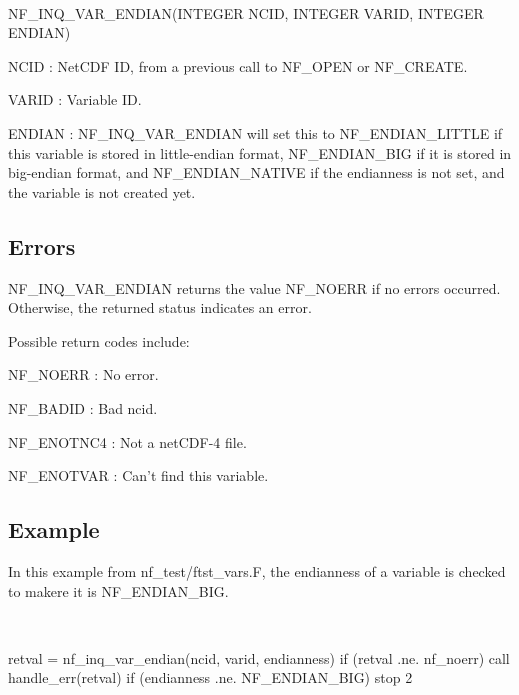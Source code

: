  

N\+F\+\_\+\+I\+N\+Q\+\_\+\+V\+A\+R\+\_\+\+E\+N\+D\+I\+A\+N(\+I\+N\+T\+E\+G\+E\+R N\+C\+I\+D, I\+N\+T\+E\+G\+E\+R V\+A\+R\+I\+D, I\+N\+T\+E\+G\+E\+R E\+N\+D\+I\+A\+N)

{\ttfamily N\+C\+ID} \+: Net\+C\+DF ID, from a previous call to N\+F\+\_\+\+O\+P\+EN or N\+F\+\_\+\+C\+R\+E\+A\+TE.

{\ttfamily V\+A\+R\+ID} \+: Variable ID.

{\ttfamily E\+N\+D\+I\+AN} \+: N\+F\+\_\+\+I\+N\+Q\+\_\+\+V\+A\+R\+\_\+\+E\+N\+D\+I\+AN will set this to N\+F\+\_\+\+E\+N\+D\+I\+A\+N\+\_\+\+L\+I\+T\+T\+LE if this variable is stored in little-\/endian format, N\+F\+\_\+\+E\+N\+D\+I\+A\+N\+\_\+\+B\+IG if it is stored in big-\/endian format, and N\+F\+\_\+\+E\+N\+D\+I\+A\+N\+\_\+\+N\+A\+T\+I\+VE if the endianness is not set, and the variable is not created yet.

\subsection*{Errors }

N\+F\+\_\+\+I\+N\+Q\+\_\+\+V\+A\+R\+\_\+\+E\+N\+D\+I\+AN returns the value N\+F\+\_\+\+N\+O\+E\+RR if no errors occurred. Otherwise, the returned status indicates an error.

Possible return codes include\+:

{\ttfamily N\+F\+\_\+\+N\+O\+E\+RR} \+: No error.

{\ttfamily N\+F\+\_\+\+B\+A\+D\+ID} \+: Bad ncid.

{\ttfamily N\+F\+\_\+\+E\+N\+O\+T\+N\+C4} \+: Not a net\+C\+D\+F-\/4 file.

{\ttfamily N\+F\+\_\+\+E\+N\+O\+T\+V\+AR} \+: Can’t find this variable.

\subsection*{Example }

In this example from nf\+\_\+test/ftst\+\_\+vars.\+F, the endianness of a variable is checked to makere it is N\+F\+\_\+\+E\+N\+D\+I\+A\+N\+\_\+\+B\+IG.

 

\begin{DoxyVerb}  retval = nf_inq_var_endian(ncid, varid, endianness)
  if (retval .ne. nf_noerr) call handle_err(retval)
  if (endianness .ne. NF_ENDIAN_BIG) stop 2
\end{DoxyVerb}


